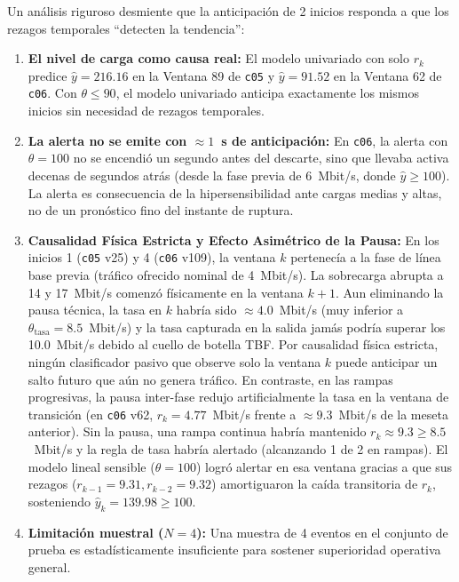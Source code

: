 \documentclass[11pt,a4paper]{article}
\begin{document}
\begin{tcolorbox}[colback=yellow!5,colframe=orange!70!black,title=\textbf{Desmitificación del Mecanismo de Anticipación}]
Un análisis riguroso desmiente que la anticipación de 2 inicios responda a que los rezagos temporales ``detecten la tendencia'':
\begin{enumerate}
    \item \textbf{El nivel de carga como causa real:} El modelo univariado con solo $r_k$ predice $\hat{y} = 216.16$ en la Ventana 89 de \texttt{c05} y $\hat{y} = 91.52$ en la Ventana 62 de \texttt{c06}. Con $\theta \le 90$, el modelo univariado anticipa exactamente los mismos inicios sin necesidad de rezagos temporales.
    \item \textbf{La alerta no se emite con $\approx 1$~s de anticipación:} En \texttt{c06}, la alerta con $\theta=100$ no se encendió un segundo antes del descarte, sino que llevaba activa decenas de segundos atrás (desde la fase previa de 6~Mbit/s, donde $\hat{y} \ge 100$). La alerta es consecuencia de la hipersensibilidad ante cargas medias y altas, no de un pronóstico fino del instante de ruptura.
    \item \textbf{Causalidad Física Estricta y Efecto Asimétrico de la Pausa:} En los inicios 1 (\texttt{c05} v25) y 4 (\texttt{c06} v109), la ventana $k$ pertenecía a la fase de línea base previa (tráfico ofrecido nominal de 4~Mbit/s). La sobrecarga abrupta a 14 y 17~Mbit/s comenzó físicamente en la ventana $k+1$. Aun eliminando la pausa técnica, la tasa en $k$ habría sido $\approx 4.0$~Mbit/s (muy inferior a $\theta_{\text{tasa}} = 8.5$~Mbit/s) y la tasa capturada en la salida jamás podría superar los 10.0~Mbit/s debido al cuello de botella TBF. Por causalidad física estricta, ningún clasificador pasivo que observe solo la ventana $k$ puede anticipar un salto futuro que aún no genera tráfico. 
    En contraste, en las rampas progresivas, la pausa inter-fase redujo artificialmente la tasa en la ventana de transición (en \texttt{c06} v62, $r_k = 4.77$~Mbit/s frente a $\approx 9.3$~Mbit/s de la meseta anterior). Sin la pausa, una rampa continua habría mantenido $r_k \approx 9.3 \ge 8.5$~Mbit/s y la regla de tasa habría alertado (alcanzando 1 de 2 en rampas). El modelo lineal sensible ($\theta = 100$) logró alertar en esa ventana gracias a que sus rezagos ($r_{k-1} = 9.31, r_{k-2} = 9.32$) amortiguaron la caída transitoria de $r_k$, sosteniendo $\hat{y}_k = 139.98 \ge 100$.
    \item \textbf{Limitación muestral ($N = 4$):} Una muestra de 4 eventos en el conjunto de prueba es estadísticamente insuficiente para sostener superioridad operativa general.
\end{enumerate}
\end{tcolorbox}
\end{document}
